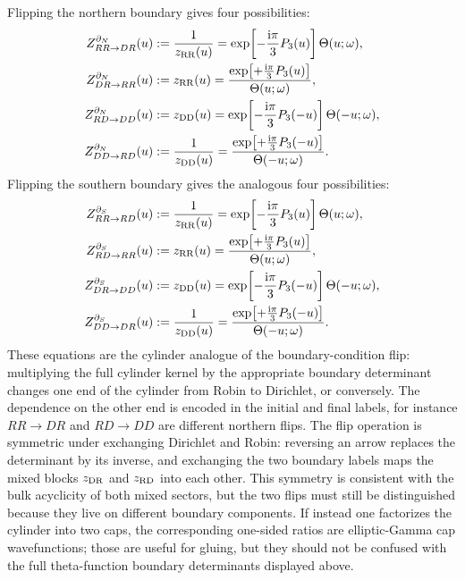 \documentclass[11pt,a4paper]{article}
\numberwithin{equation}{section}
\theoremstyle{plain}
\theoremstyle{definition}
\theoremstyle{remark}
\newcommand{\ii}{\mathrm{i}}
\newcommand{\nn}{\nonumber}
\begin{document}
Flipping the northern boundary gives four possibilities:
\begin{align}
Z^{\partial_N}_{RR\to DR}(u)
&:=\frac{1}{z_{\rm RR}(u)}
=\exp\!\left[-\frac{\ii\pi}{3}P_3(u)\right]\Theta(u;\omega),
\nn\\
Z^{\partial_N}_{DR\to RR}(u)
&:=z_{\rm RR}(u)
=\frac{\exp\!\left[+\frac{\ii\pi}{3}P_3(u)\right]}{\Theta(u;\omega)},
\nn\\
Z^{\partial_N}_{RD\to DD}(u)
&:=z_{\rm DD}(u)
=\exp\!\left[-\frac{\ii\pi}{3}P_3(-u)\right]\Theta(-u;\omega),
\nn\\
Z^{\partial_N}_{DD\to RD}(u)
&:=\frac{1}{z_{\rm DD}(u)}
=\frac{\exp\!\left[+\frac{\ii\pi}{3}P_3(-u)\right]}{\Theta(-u;\omega)}.
\label{eq:north-boundary-flips-theta}
\end{align}
Flipping the southern boundary gives the analogous four possibilities:
\begin{align}
Z^{\partial_S}_{RR\to RD}(u)
&:=\frac{1}{z_{\rm RR}(u)}
=\exp\!\left[-\frac{\ii\pi}{3}P_3(u)\right]\Theta(u;\omega),
\nn\\
Z^{\partial_S}_{RD\to RR}(u)
&:=z_{\rm RR}(u)
=\frac{\exp\!\left[+\frac{\ii\pi}{3}P_3(u)\right]}{\Theta(u;\omega)},
\nn\\
Z^{\partial_S}_{DR\to DD}(u)
&:=z_{\rm DD}(u)
=\exp\!\left[-\frac{\ii\pi}{3}P_3(-u)\right]\Theta(-u;\omega),
\nn\\
Z^{\partial_S}_{DD\to DR}(u)
&:=\frac{1}{z_{\rm DD}(u)}
=\frac{\exp\!\left[+\frac{\ii\pi}{3}P_3(-u)\right]}{\Theta(-u;\omega)}.
\label{eq:south-boundary-flips-theta}
\end{align}
These equations are the cylinder analogue of the boundary-condition flip: multiplying the full cylinder kernel by the appropriate boundary determinant changes one end of the cylinder from Robin to Dirichlet, or conversely.  The dependence on the other end is encoded in the initial and final labels, for instance \(RR\to DR\) and \(RD\to DD\) are different northern flips.  The flip operation is symmetric under exchanging Dirichlet and Robin: reversing an arrow replaces the determinant by its inverse, and exchanging the two boundary labels maps the mixed blocks \(z_{\rm DR}\) and \(z_{\rm RD}\) into each other.  This symmetry is consistent with the bulk acyclicity of both mixed sectors, but the two flips must still be distinguished because they live on different boundary components.  If instead one factorizes the cylinder into two caps, the corresponding one-sided ratios are elliptic-Gamma cap wavefunctions; those are useful for gluing, but they should not be confused with the full theta-function boundary determinants displayed above.
\end{document}
